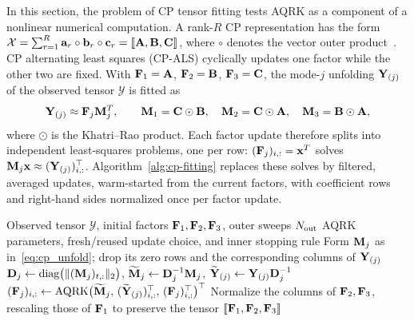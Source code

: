 \documentclass[pdflatex,sn-mathphys-num]{sn-jnl}
\theoremstyle{thmstyleone}
\theoremstyle{thmstylethree}
\newcommand{\vx}{\mathbf{x}}
\begin{document}
In this section, the problem of CP tensor fitting tests AQRK as a component of a nonlinear numerical
computation. A rank-$R$ CP representation has the form
$\mathcal X=\sum_{r=1}^R{\bf a}_r\circ{\bf b}_r\circ{\bf c}_r
=\llbracket{\bf A},{\bf B},{\bf C}\rrbracket$,
where $\circ$ denotes the vector outer product~\cite{kolda2009tensor}. CP alternating least squares (CP-ALS) cyclically updates one factor
while the other two are fixed. With ${\bf F}_1={\bf A}$,
${\bf F}_2={\bf B}$, ${\bf F}_3={\bf C}$, the mode-$j$ unfolding
${\bf Y}_{(j)}$ of the observed tensor $\mathcal Y$ is fitted as
\begin{equation}\label{eq:cp_unfold}
{\bf Y}_{(j)}\approx{\bf F}_j{\bf M}_j^T,\qquad
{\bf M}_1={\bf C}\odot{\bf B},\quad
{\bf M}_2={\bf C}\odot{\bf A},\quad
{\bf M}_3={\bf B}\odot{\bf A},
\end{equation}
where $\odot$ is the Khatri--Rao product. Each factor update therefore
splits into independent least-squares problems, one per row:
$({\bf F}_j)_{i,:}=\vx^T$ solves
${\bf M}_j\vx\approx({\bf Y}_{(j)})_{i,:}^{\top}$.
Algorithm~\ref{alg:cp-fitting} replaces these solves by filtered,
averaged updates, warm-started from the current factors, with
coefficient rows and right-hand sides normalized once per factor update.
\begin{algorithm}[htbp]
\caption{CP fitting with filtered, averaged inner updates}
\label{alg:cp-fitting}
\begin{algorithmic}[1]
\Require Observed tensor $\mathcal Y$, initial factors
         ${\bf F}_1,{\bf F}_2,{\bf F}_3$, outer sweeps $N_{\rm out}$
\Require AQRK parameters, fresh/reused update choice,
         and inner stopping rule
        \State Form ${\bf M}_j$ as in~\eqref{eq:cp_unfold}; drop its zero
               rows and the corresponding columns of ${\bf Y}_{(j)}$
        \State ${\bf D}_j\gets\operatorname{diag}\bigl(\|({\bf M}_j)_{t,:}\|_2\bigr)$,
               $\widetilde{\bf M}_j\gets{\bf D}_j^{-1}{\bf M}_j$,
               $\widetilde{\bf Y}_{(j)}\gets{\bf Y}_{(j)}{\bf D}_j^{-1}$
            \State $({\bf F}_j)_{i,:}\gets\operatorname{AQRK}
                   \bigl(\widetilde{\bf M}_j,\,
                   (\widetilde{\bf Y}_{(j)})_{i,:}^{\top},\,
                   ({\bf F}_j)_{i,:}^{\top}\bigr)^{\top}$
        \EndFor
    \EndFor
    \State Normalize the columns of ${\bf F}_2,{\bf F}_3$, rescaling
           those of ${\bf F}_1$ to preserve the tensor
\EndFor
\State \Return $\llbracket{\bf F}_1,{\bf F}_2,{\bf F}_3\rrbracket$
\end{algorithmic}
\end{algorithm}
\end{document}
